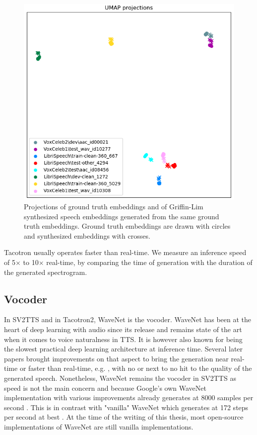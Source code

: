 \documentclass[a4paper, oneside, 12pt, english]{article}
\begin{document}
\begin{figure}[h]
	\centering
	\includegraphics[width=0.65\linewidth]{images/projections_griffin.png}
	\caption{Projections of ground truth embeddings and of Griffin-Lim synthesized speech embeddings generated from the same ground truth embeddings. Ground truth embeddings are drawn with circles and synthesized embeddings with crosses.}
	\label{projections_griffin}
\end{figure}

Tacotron usually operates faster than real-time. We measure an inference speed of 5$\times$ to 10$\times$ real-time, by comparing the time of generation with the duration of the generated spectrogram.


\subsection{Vocoder} \label{vocoder}
In SV2TTS and in Tacotron2, WaveNet is the vocoder. WaveNet has been at the heart of deep learning with audio since its release and remains state of the art when it comes to voice naturalness in TTS. It is however also known for being the slowest practical deep learning architecture at inference time. Several later papers brought improvements on that aspect to bring the generation near real-time or faster than real-time, e.g. \citep{ParallelWaveNet, FastWaveNet, WaveRNN}, with no or next to no hit to the quality of the generated speech. Nonetheless, WaveNet remains the vocoder in SV2TTS as speed is not the main concern and because Google's own WaveNet implementation with various improvements already generates at 8000 samples per second \citep[page~2]{WaveRNN}. This is in contrast with "vanilla" WaveNet which generates at 172 steps per second at best \citep[page 7]{ParallelWaveNet}. At the time of the writing of this thesis, most open-source implementations of WaveNet are still vanilla implementations.
\end{document}
